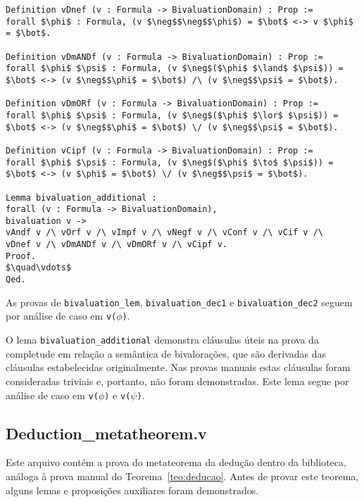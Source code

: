 \begin{lstlisting}[name=Semantics, frame=single, language=coq]
Definition vDnef (v : Formula -> BivaluationDomain) : Prop :=
forall $\phi$ : Formula, (v $\neg$$\neg$$\phi$) = $\bot$ <-> v $\phi$ = $\bot$.

Definition vDmANDf (v : Formula -> BivaluationDomain) : Prop :=
forall $\phi$ $\psi$ : Formula, (v $\neg$($\phi$ $\land$ $\psi$)) = $\bot$ <-> (v $\neg$$\phi$ = $\bot$) /\ (v $\neg$$\psi$ = $\bot$).

Definition vDmORf (v : Formula -> BivaluationDomain) : Prop :=
forall $\phi$ $\psi$ : Formula, (v $\neg$($\phi$ $\lor$ $\psi$)) = $\bot$ <-> (v $\neg$$\phi$ = $\bot$) \/ (v $\neg$$\psi$ = $\bot$).

Definition vCipf (v : Formula -> BivaluationDomain) : Prop :=
forall $\phi$ $\psi$ : Formula, (v $\neg$($\phi$ $\to$ $\psi$)) = $\bot$ <-> (v $\phi$ = $\bot$) \/ (v $\neg$$\psi$ = $\bot$).

Lemma bivaluation_additional : 
forall (v : Formula -> BivaluationDomain),
bivaluation v ->
vAndf v /\ vOrf v /\ vImpf v /\ vNegf v /\ vConf v /\ vCif v /\
vDnef v /\ vDmANDf v /\ vDmORf v /\ vCipf v.
Proof.
$\quad\vdots$
Qed.
            \end{lstlisting}
            As provas de \texttt{bivaluation\_lem}, \texttt{bivaluation\_dec1} e \texttt{bivaluation\_dec2} seguem por análise de caso em \texttt{v($\phi$)}.

            O lema \texttt{bivaluation\_additional} demonstra cláusulas úteis na prova da completude em relação a semântica de bivalorações, que são derivadas das cláusulas estabelecidas originalmente. Nas provas manuais estas cláusulas foram consideradas triviais e, portanto, não foram demonstradas. Este lema segue por análise de caso em \texttt{v($\phi$)} e \texttt{v($\psi$)}.

          \subsection{Deduction\_metatheorem.v}

            Este arquivo contém a prova do metateorema da dedução dentro da biblioteca, análoga à prova manual do Teorema~\ref{teo:deducao}. Antes de provar este teorema, alguns lemas e proposições auxiliares foram demonstrados.
          
